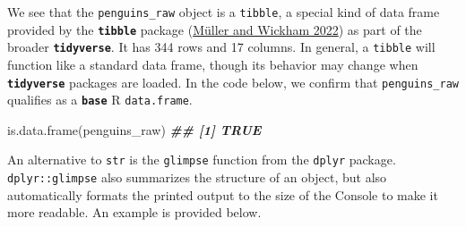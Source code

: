 \documentclass[
]{book}
\newenvironment{Shaded}{\begin{snugshade}}{\end{snugshade}}
\newcommand{\DocumentationTok}[1]{\textcolor[rgb]{0.56,0.35,0.01}{\textbf{\textit{#1}}}}
\newcommand{\FunctionTok}[1]{\textcolor[rgb]{0.00,0.00,0.00}{#1}}
\newcommand{\NormalTok}[1]{#1}
\theoremstyle{definition}
\theoremstyle{definition}
\theoremstyle{definition}
\theoremstyle{definition}
\theoremstyle{remark}
\begin{document}
We see that the \texttt{penguins\_raw} object is a \texttt{tibble}, a special kind of data frame provided by the \textbf{\texttt{tibble}} package (\protect\hyperlink{ref-R-tibble}{Müller and Wickham 2022}) as part of the broader \textbf{\texttt{tidyverse}}. It has 344 rows and 17 columns. In general, a \texttt{tibble} will function like a standard data frame, though its behavior may change when \textbf{\texttt{tidyverse}} packages are loaded. In the code below, we confirm that \texttt{penguins\_raw} qualifies as a \textbf{\texttt{base}} R \texttt{data.frame}.

\begin{Shaded}
\begin{Highlighting}[]
\FunctionTok{is.data.frame}\NormalTok{(penguins\_raw)}
\DocumentationTok{\#\# [1] TRUE}
\end{Highlighting}
\end{Shaded}

An alternative to \texttt{str} is the \texttt{glimpse} function from the \texttt{dplyr} package. \texttt{dplyr::glimpse} also summarizes the structure of an object, but also automatically formats the printed output to the size of the Console to make it more readable. An example is provided below.
\end{document}
